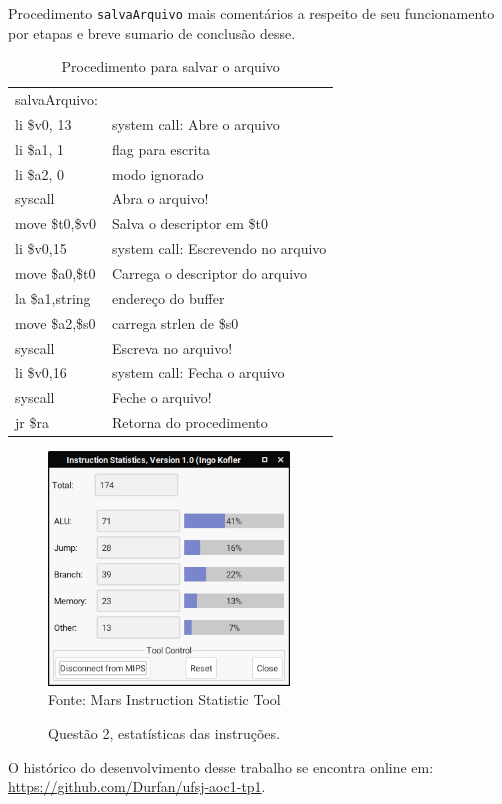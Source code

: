 \documentclass[12pt,a4paper]{article}
\numberwithin{figure}{subsection}
\numberwithin{table}{subsection}
\begin{document}
Procedimento \texttt{salvaArquivo} mais comentários a respeito de seu funcionamento por etapas e breve sumario de conclusão desse.

\begin{table}[H]
	\renewcommand{\arraystretch}{1}
	\centering
	\caption*{Procedimento para salvar o arquivo}
	\label{q2cod:salvafile}
	\begin{tabular}{>{\ttfamily}p{4cm} p{11cm}}
		\toprule
		salvaArquivo:    & \\
		li \$v0, 13      & system call: Abre o arquivo \\
		li \$a1, 1       & flag para escrita \\
		li \$a2, 0       & modo ignorado \\
		syscall          & Abra o arquivo! \\
		move \$t0,\$v0   & Salva o descriptor em \$t0 \\
		\midrule[0.01cm]
		li \$v0,15       & system call: Escrevendo no arquivo \\
		move \$a0,\$t0   & Carrega o descriptor do arquivo \\
		la \$a1,string   & endereço do buffer \\
		move \$a2,\$s0   & carrega strlen de \$s0 \\
		syscall          & Escreva no arquivo! \\
		\midrule[0.01cm]
		li \$v0,16       & system call: Fecha o arquivo \\
		syscall          & Feche o arquivo! \\
		jr \$ra          & Retorna do procedimento \\
		\bottomrule
	\end{tabular}
\end{table}

\lipsum[1]

\begin{figure}[H]
	\centering
	\caption{Questão 2, estatísticas das instruções.}
	\vspace{0.2cm}
	\includegraphics[width=242px]{questao2_stats}
	\\\footnotesize Fonte: Mars Instruction Statistic Tool
\end{figure}

\pagebreak

\begin{flushleft}
	\nocite{*}
	
	\vfill
	O histórico do desenvolvimento desse trabalho se encontra online em:\\ \url{https://github.com/Durfan/ufsj-aoc1-tp1}.
\end{flushleft}
\end{document}
